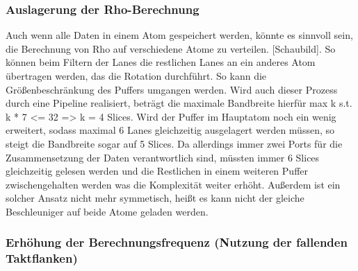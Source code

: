 \subsubsection{Auslagerung der Rho-Berechnung}
Auch wenn alle Daten in einem Atom gespeichert werden, könnte es sinnvoll sein, die Berechnung von Rho auf verschiedene Atome zu verteilen.
[Schaubild]. So können beim Filtern der Lanes die restlichen Lanes an ein anderes Atom übertragen werden, das die Rotation durchführt.
So kann die Größenbeschränkung des Puffers umgangen werden. Wird auch dieser Prozess durch eine Pipeline realisiert, beträgt die maximale Bandbreite hierfür
max k s.t. k * 7 <= 32
=> k = 4 Slices. Wird der Puffer im Hauptatom noch ein wenig erweitert, sodass maximal 6 Lanes gleichzeitig ausgelagert werden müssen, so steigt die Bandbreite sogar
auf 5 Slices. Da allerdings immer zwei Ports für die Zusammensetzung der Daten verantwortlich sind, müssten immer 6 Slices gleichzeitig gelesen werden und die
Restlichen in einem weiteren Puffer zwischengehalten werden was die Komplexität weiter erhöht. Außerdem ist ein solcher Ansatz nicht mehr symmetisch,
heißt es kann nicht der gleiche Beschleuniger auf beide Atome geladen werden.

\subsubsection{Erhöhung der Berechnungsfrequenz (Nutzung der fallenden Taktflanken)}
